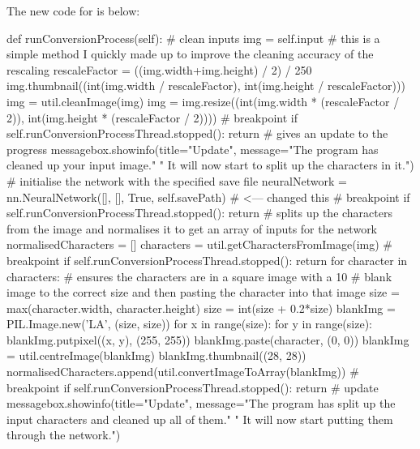 \documentclass{report}
\begin{document}
\newline
The new code for  is below:
\begin{python}
def runConversionProcess(self):
    # clean inputs
    img = self.input
    # this is a simple method I quickly made up to improve the cleaning accuracy of the rescaling
    rescaleFactor = ((img.width+img.height) / 2) / 250
    img.thumbnail((int(img.width / rescaleFactor), int(img.height / rescaleFactor)))
    img = util.cleanImage(img)
    img = img.resize((int(img.width * (rescaleFactor / 2)), int(img.height * (rescaleFactor / 2))))
    # breakpoint
    if self.runConversionProcessThread.stopped():
        return
    # gives an update to the progress
    messagebox.showinfo(title="Update",
        message="The program has cleaned up your input image."
        " It will now start to split up the characters in it.")
    # initialise the network with the specified save file
    neuralNetwork = nn.NeuralNetwork([], [], True, self.savePath)  # <--- changed this
    # breakpoint
    if self.runConversionProcessThread.stopped():
        return
    # splits up the characters from the image and normalises it to get an array of inputs for the network
    normalisedCharacters = []
    characters = util.getCharactersFromImage(img)
    # breakpoint
    if self.runConversionProcessThread.stopped():
        return
    for character in characters:
        # ensures the characters are in a square image with a 10%
        # blank image to the correct size and then pasting the character into that image
        size = max(character.width, character.height)
        size = int(size + 0.2*size)
        blankImg = PIL.Image.new('LA', (size, size))
        for x in range(size):
            for y in range(size):
                blankImg.putpixel((x, y), (255, 255))
        blankImg.paste(character, (0, 0))
        blankImg = util.centreImage(blankImg)
        blankImg.thumbnail((28, 28))
        normalisedCharacters.append(util.convertImageToArray(blankImg))
        # breakpoint
        if self.runConversionProcessThread.stopped():
            return
    # update
    messagebox.showinfo(title="Update",
        message="The program has split up the input characters and cleaned up all of them."
        " It will now start putting them through the network.")


\end{python}
\end{document}
